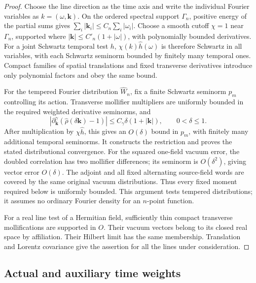 \begin{proof}
Choose the line direction as the time axis and write the individual
Fourier variables as $k=(\omega,\boldsymbol k)$.  On the ordered
spectral support $\Gamma_n$, positive energy of the partial sums gives
$\sum_i|\boldsymbol k_i|\leq C_n\sum_i|\omega_i|$.
Choose a smooth cutoff $\chi=1$ near $\Gamma_n$, supported where
$|\boldsymbol k|\leq C'_n(1+|\omega|)$, with polynomially bounded
derivatives.  For a joint Schwartz temporal test $h$,
$\chi(k)\widehat h(\omega)$ is therefore Schwartz in all variables,
with each Schwartz seminorm bounded by finitely many temporal ones.
Compact families of spatial translations and fixed transverse
derivatives introduce only polynomial factors and obey the same bound.

For the tempered Fourier distribution $\widehat W_n$, fix a finite
Schwartz seminorm $p_m$ controlling its action.  Transverse mollifier
multipliers are uniformly bounded in the required weighted derivative
seminorms, and
\[
 |\partial_{\boldsymbol k}^{\gamma}
       (\widehat\rho(\delta\boldsymbol k)-1)|
       \leq C_\gamma\delta(1+|\boldsymbol k|),\qquad 0<\delta\leq1.
\]
After multiplication by $\chi\widehat h$, this gives an $O(\delta)$
bound in $p_m$, with finitely many additional temporal seminorms.
It constructs the restriction and proves the stated distributional
convergence.  For the squared one-field vacuum error, the doubled
correlation has two mollifier differences; its seminorm is
$O(\delta^2)$, giving vector error $O(\delta)$.  The adjoint and all
fixed alternating source-field words are covered by the same original
vacuum distributions.  Thus every fixed moment required below is
uniformly bounded.  This argument tests tempered distributions; it
assumes no ordinary Fourier density for an $n$-point function.

For a real line test of a Hermitian field, sufficiently thin compact
transverse mollifications are supported in $O$.  Their vacuum vectors
belong to its closed real space by affiliation.  Their Hilbert limit
has the same membership.  Translation and Lorentz covariance give the
assertion for all the lines under consideration.
\end{proof}

\subsection{Actual and auxiliary time weights}

